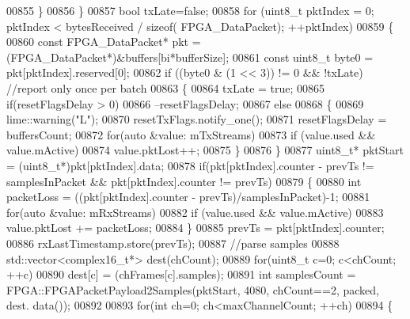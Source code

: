 \begin{DoxyCode}
{{00855             \}
00856         \}
00857         \textcolor{keywordtype}{bool} txLate=\textcolor{keyword}{false};
00858         \textcolor{keywordflow}{for} (uint8\_t pktIndex = 0; pktIndex < bytesReceived / \textcolor{keyword}{sizeof}(
      FPGA_DataPacket); ++pktIndex)
00859         \{
00860             \textcolor{keyword}{const} FPGA_DataPacket* pkt = (FPGA_DataPacket*)&buffers[bi*bufferSize];
00861             \textcolor{keyword}{const} uint8\_t byte0 = pkt[pktIndex].reserved[0];
00862             \textcolor{keywordflow}{if} ((byte0 & (1 << 3)) != 0 && !txLate) \textcolor{comment}{//report only once per batch}
00863             \{
00864                 txLate = \textcolor{keyword}{true};
00865                 \textcolor{keywordflow}{if}(resetFlagsDelay > 0)
00866                     --resetFlagsDelay;
00867                 \textcolor{keywordflow}{else}
00868                 \{
00869                     lime::warning(\textcolor{stringliteral}{"L"});
00870                     resetTxFlags.notify\_one();
00871                     resetFlagsDelay = buffersCount;
00872                     \textcolor{keywordflow}{for}(\textcolor{keyword}{auto} &value: mTxStreams)
00873                         \textcolor{keywordflow}{if} (value.used && value.mActive)
00874                             value.pktLost++;
00875                 \}
00876             \}
00877             uint8\_t* pktStart = (uint8\_t*)pkt[pktIndex].data;
00878             \textcolor{keywordflow}{if}(pkt[pktIndex].counter - prevTs != samplesInPacket && pkt[pktIndex].counter != prevTs)
00879             \{
00880                 \textcolor{keywordtype}{int} packetLoss = ((pkt[pktIndex].counter - prevTs)/samplesInPacket)-1;
00881                 \textcolor{keywordflow}{for}(\textcolor{keyword}{auto} &value: mRxStreams)
00882                     \textcolor{keywordflow}{if} (value.used && value.mActive)
00883                         value.pktLost += packetLoss;
00884             \}
00885             prevTs = pkt[pktIndex].counter;
00886             rxLastTimestamp.store(prevTs);
00887             \textcolor{comment}{//parse samples}
00888             std::vector<complex16\_t*> dest(chCount);
00889             \textcolor{keywordflow}{for}(uint8\_t c=0; c<chCount; ++c)
00890                 dest[c] = (chFrames[c].samples);
00891             \textcolor{keywordtype}{int} samplesCount = FPGA::FPGAPacketPayload2Samples(pktStart, 4080, chCount==2, packed, dest.
      data());
00892 
00893             \textcolor{keywordflow}{for}(\textcolor{keywordtype}{int} ch=0; ch<maxChannelCount; ++ch)
00894             \{
}}
\end{DoxyCode}
